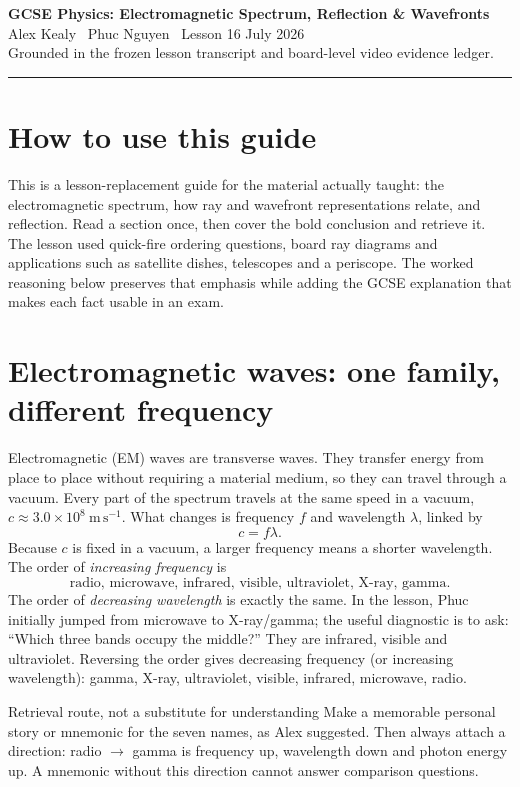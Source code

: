 \documentclass[10pt,a4paper]{article}
\newcommand{\ruleline}{\noindent\rule{\linewidth}{.4pt}}
\begin{document}
\begin{center}{\LARGE\bfseries GCSE Physics: Electromagnetic Spectrum, Reflection \& Wavefronts}\\[3pt]
Alex Kealy \textbullet\ Phuc Nguyen \textbullet\ Lesson 16 July 2026\\[5pt]
\small Grounded in the frozen lesson transcript and board-level video evidence ledger.
\end{center}\ruleline
\section*{How to use this guide}
This is a lesson-replacement guide for the material actually taught: the electromagnetic spectrum, how ray and wavefront representations relate, and reflection. Read a section once, then cover the bold conclusion and retrieve it. The lesson used quick-fire ordering questions, board ray diagrams and applications such as satellite dishes, telescopes and a periscope. The worked reasoning below preserves that emphasis while adding the GCSE explanation that makes each fact usable in an exam.

\section{Electromagnetic waves: one family, different frequency}
Electromagnetic (EM) waves are transverse waves. They transfer energy from place to place without requiring a material medium, so they can travel through a vacuum. Every part of the spectrum travels at the same speed in a vacuum, $c\approx3.0\times10^8\ \mathrm{m\,s^{-1}}$. What changes is frequency $f$ and wavelength $\lambda$, linked by
\[c=f\lambda.\]
Because $c$ is fixed in a vacuum, a larger frequency means a shorter wavelength. The order of \emph{increasing frequency} is
\[\boxed{\text{radio, microwave, infrared, visible, ultraviolet, X-ray, gamma}.}\]
The order of \emph{decreasing wavelength} is exactly the same. In the lesson, Phuc initially jumped from microwave to X-ray/gamma; the useful diagnostic is to ask: ``Which three bands occupy the middle?'' They are infrared, visible and ultraviolet. Reversing the order gives decreasing frequency (or increasing wavelength): gamma, X-ray, ultraviolet, visible, infrared, microwave, radio.

\begin{keybox}{Retrieval route, not a substitute for understanding}
Make a memorable personal story or mnemonic for the seven names, as Alex suggested. Then always attach a direction: radio $\rightarrow$ gamma is frequency up, wavelength down and photon energy up. A mnemonic without this direction cannot answer comparison questions.
\end{keybox}
\end{document}
